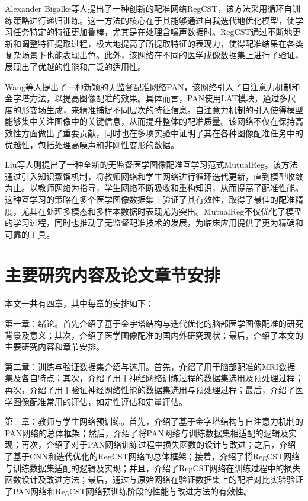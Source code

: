 Alexander Bigalke等人提出了一种创新的配准网络RegCST\cite{bigalke2023unsupervised}，该方法采用循环自训练策略进行递归训练。这一方法的核心在于其能够通过自我迭代地优化模型，使学习任务特定的特征更加鲁棒，尤其是在处理含噪声数据时。RegCST通过不断地更新和调整特征提取过程，极大地提高了所提取特征的表现力，使得配准结果在各类复杂场景下也能表现出色。此外，该网络在不同的医学成像数据集上进行了验证，展现出了优越的性能和广泛的适用性。

Wang等人提出了一种新颖的无监督配准网络PAN\cite{wang2024pyramid}，该网络引入了自注意力机制和金字塔方法，以提高图像配准的效果。具体而言，PAN使用LAT模块，通过多尺度的形变场生成，来精准捕捉不同层次的特征信息。自注意力机制的引入使得模型能够集中关注图像中的关键信息，从而提升整体的配准质量。该网络不仅在保持高效性方面做出了重要贡献，同时也在多项实验中证明了其在各种图像配准任务中的优越性，包括处理高噪声和非刚性变形的数据。

Liu等人则提出了一种全新的无监督医学图像配准互学习范式MutualReg\cite{liu2024mutualreg}。该方法通过引入知识蒸馏机制，将教师网络和学生网络进行循环迭代更新，直到模型收敛为止。以教师网络为指导，学生网络不断吸收和重构知识，从而提高了配准性能。这种互学习的策略在多个医学图像数据集上验证了其有效性，取得了最佳的配准精度，尤其在处理多模态和多样本数据时表现尤为突出。MutualReg不仅优化了模型的学习过程，同时也推动了无监督配准技术的发展，为临床应用提供了更为精确和可靠的工具。


\section{主要研究内容及论文章节安排}

本文一共有四章，其中每章的安排如下：

第一章：绪论。首先介绍了基于金字塔结构与迭代优化的脑部医学图像配准的研究背景及意义；其次，介绍了医学图像配准的国内外研究现状；最后，介绍了本文的主要研究内容和章节安排。

第二章：训练与验证数据集介绍与选用。首先，介绍了用于脑部配准的MRI数据集及各自特点；其次，介绍了用于神经网络训练过程的数据集选用及预处理过程；再次，介绍了用于验证神经网络性能的数据集选用与预处理过程；最后，介绍了医学图像配准常用的评估，如定性评估和定量评估。

第三章：教师与学生网络预训练。首先，介绍了基于金字塔结构与自注意力机制的PAN网络的总体框架；然后，介绍了将PAN网络与训练数据集相适配的逻辑及实现；再次，介绍了对于PAN网络训练过程中损失函数的设计与改进；之后，介绍了基于CNN和迭代优化的RegCST网络的总体框架；接着，介绍了将RegCST网络与训练数据集适配的逻辑及实现；并且，介绍了RegCST网络在训练过程中的损失函数设计及改进方法；最后，通过与原始网络在验证数据集上的配准对比实验验证了PAN网络和RegCST网络预训练阶段的性能与改进方法的有效性。

